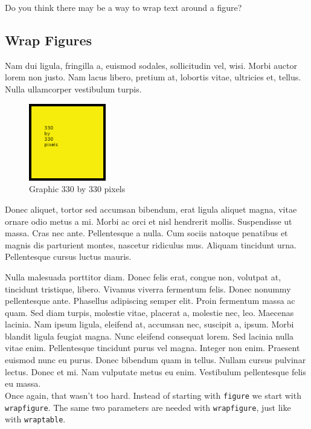 Do you think there may be a way to wrap text around a figure?

\newpage

\subsection*{Wrap Figures}

Nam dui ligula, fringilla a, euismod sodales, sollicitudin vel, wisi. Morbi auctor lorem non justo. Nam lacus libero, pretium at, lobortis vitae, ultricies et, tellus.   Nulla ullamcorper vestibulum turpis.

\begin{figure}
\centering
\includegraphics[width=0.3\textwidth]{330x330}
\caption{Graphic 330 by 330 pixels}\label{fg:330x330}
\end{figure}

Donec aliquet, tortor sed accumsan bibendum, erat ligula aliquet magna, vitae ornare odio metus a mi. Morbi ac orci et nisl hendrerit mollis. Suspendisse ut massa. Cras nec ante. Pellentesque a nulla. Cum sociis natoque penatibus et magnis dis parturient montes, nascetur ridiculus mus. Aliquam tincidunt urna. Pellentesque cursus luctus mauris.

Nulla malesuada porttitor diam. Donec felis erat, congue non, volutpat at, tincidunt tristique, libero. Vivamus viverra fermentum felis. Donec nonummy pellentesque ante. Phasellus adipiscing semper elit. Proin fermentum massa ac quam. Sed diam turpis, molestie vitae, placerat a, molestie nec, leo. Maecenas lacinia. Nam ipsum ligula, eleifend at, accumsan nec, suscipit a, ipsum. Morbi blandit ligula feugiat magna. Nunc eleifend consequat lorem. Sed lacinia nulla vitae enim. Pellentesque tincidunt purus vel magna. Integer non enim. Praesent euismod nunc eu purus. Donec bibendum quam in tellus. Nullam cursus pulvinar lectus. Donec et mi. Nam vulputate metus eu enim. Vestibulum pellentesque felis eu massa.\\

Once again, that wasn't too hard.  Instead of starting with \texttt{figure} we start with \texttt{wrapfigure}.  The same two parameters are needed with \texttt{wrapfigure}, just like with \texttt{wraptable}.\\

